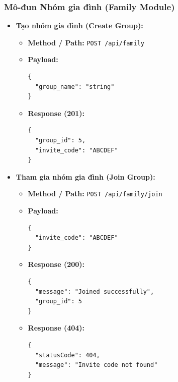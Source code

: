 \documentclass[../main.tex]{subfiles}
\begin{document}
\subsubsection{Mô-đun Nhóm gia đình (Family Module)}
\begin{itemize}[leftmargin=*]
    \item \textbf{Tạo nhóm gia đình (Create Group):}
    \begin{itemize}
        \item \textbf{Method / Path:} \texttt{POST /api/family}
        \item \textbf{Payload:}
\begin{lstlisting}[style=jsonstyle]
{
  "group_name": "string"
}
\end{lstlisting}
        \item \textbf{Response (201):}
\begin{lstlisting}[style=jsonstyle]
{
  "group_id": 5,
  "invite_code": "ABCDEF"
}
\end{lstlisting}
    \end{itemize}
    \item \textbf{Tham gia nhóm gia đình (Join Group):}
    \begin{itemize}
        \item \textbf{Method / Path:} \texttt{POST /api/family/join}
        \item \textbf{Payload:}
\begin{lstlisting}[style=jsonstyle]
{
  "invite_code": "ABCDEF"
}
\end{lstlisting}
        \item \textbf{Response (200):}
\begin{lstlisting}[style=jsonstyle]
{
  "message": "Joined successfully",
  "group_id": 5
}
\end{lstlisting}
        \item \textbf{Response (404):}
\begin{lstlisting}[style=jsonstyle]
{
  "statusCode": 404,
  "message": "Invite code not found"
}
\end{lstlisting}
    \end{itemize}
\end{itemize}
\end{document}
